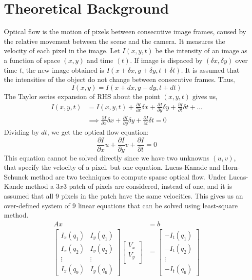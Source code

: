 \documentclass{article}
\begin{document}
\section{Theoretical Background}\label{Theory}
Optical flow is the motion of pixels between consecutive image frames, caused by the relative movement between the scene and the camera. It measures the velocity of each pixel in the image. Let $I(x,y,t)$ be the intensity of an image as a function of space $(x,y)$ and time $(t)$. If image is dispaced by $(\delta x,\delta y)$ over time $t$, the new image obtained is $I(x+\delta x, y+\delta y, t+\delta t)$. It is assumed that the intensities of the object do not change between consecutive frames. Thus,
\[
I(x,y) = I(x+dx, y+dy, t+dt)
\]
The Taylor series expansion of RHS about the point $(x,y,t)$ gives us,
\begin{align*}
I(x,y,t) &= I(x,y,t) + \frac{\partial I}{\partial x} \delta x + \frac{\partial  I}{\partial y} \delta y + \frac{\partial  I}{\partial t} \delta t + ... \\
&\implies \frac{\partial I}{\partial x} \delta x + \frac{\partial  I}{\partial y} \delta y + \frac{\partial  I}{\partial t} \delta t = 0
\end{align*}
Dividing by $dt$, we get the optical flow equation:
\[
 \frac{\partial I}{\partial x}u +  \frac{\partial I}{\partial y}v +  \frac{\partial I}{\partial t} = 0
\]
This equation cannot be solved directly since we have two unknowns $(u,v)$, that specify the velocity of a pixel, but one equation. 
Lucas-Kanade and Horn-Schunck method are two techniques to compute sparse optical flow. Under Lucas-Kande method a $3x3$ patch of pixels are considered, instead of one, and it is assumed that all $9$ pixels in the patch have the same velocities. This gives us an over-defined system of $9$ linear equations that can be solved using least-square method.
\begin{align*}
Ax &= b \\
\begin{bmatrix}
I_x(q_1) & I_y(q_1) \\
I_x(q_2) & I_y(q_2) \\
\vdots & \vdots   \\
I_x(q_9) & I_y(q_9)
\end{bmatrix}
\begin{bmatrix}
V_x \\
V_y\\
\end{bmatrix}
&=
\begin{bmatrix}
-I_t(q_1) \\
-I_t(q_2) \\
\vdots \\
-I_t(q_9)
\end{bmatrix}
\end{align*}
\end{document}
